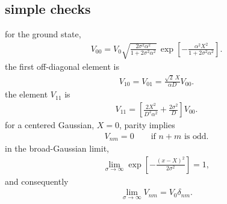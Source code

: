 \subsection{simple checks}
for the ground state,
\begin{align}
    \boxed{
        V_{00}
        =
        V_0 \sqrt{\frac{2\sigma^2\alpha^2}{1+2\sigma^2\alpha^2}}\,
        \exp\left[
            -\frac{\alpha^2X^2}{1+2\sigma^2\alpha^2}
            \right].
    }
\end{align}
the first off-diagonal element is
\begin{align}
    \boxed{
        V_{10}=V_{01}
        =
        \frac{\sqrt{2}\,X}{\alpha D}V_{00}.
    }
\end{align}
the element $V_{11}$ is
\begin{align}
    \boxed{
        V_{11}
        =
        \left[
            \frac{2X^2}{D^2\alpha^2}
            +
            \frac{2\sigma^2}{D}
            \right]V_{00}.
    }
\end{align}
for a centered Gaussian, $X=0$, parity implies
\begin{align}
    \boxed{
        V_{nm}=0
        \qquad\text{if }n+m\text{ is odd}.
    }
\end{align}
in the broad-Gaussian limit,
\begin{align}
    \lim_{\sigma\to\infty}
    \exp\left[-\frac{(x-X)^2}{2\sigma^2}\right]=1,
\end{align}
and consequently
\begin{align}
    \boxed{
        \lim_{\sigma\to\infty}V_{nm}=V_0\delta_{nm}.
    }
\end{align}


